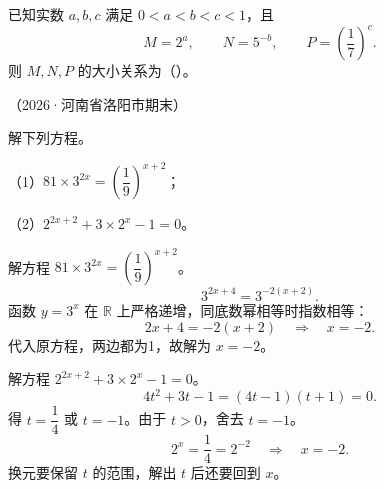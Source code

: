 \begin{frame}[t,label=AV04q]
  已知实数 $a,b,c$ 满足 $0<a<b<c<1$，且
  \[
    M=2^a,\qquad N=5^{-b},\qquad P=\left(\frac17\right)^c.
  \]
  则 $M,N,P$ 的大小关系为（\quad）。
  \par\vspace{0.2cm}（2026·河南省洛阳市期末）
  \pause
\end{frame}

\begin{frame}[t,label=A11q]
  解下列方程。
  \par\vspace{0.25cm}
  （1）$81\times3^{2x}=\left(\dfrac19\right)^{x+2}$；
  \par\vspace{0.25cm}
  （2）$2^{2x+2}+3\times2^x-1=0$。
  \pause
\end{frame}

\begin{frame}[t,label=A11a1]
  解方程 $81\times3^{2x}=\left(\dfrac19\right)^{x+2}$。
  \pause
  \[
    3^{2x+4}=3^{-2(x+2)}.
  \]
  函数 $y=3^x$ 在 $\mathbb R$ 上严格递增，同底数幂相等时指数相等：
  \[
    2x+4=-2(x+2)\quad\Longrightarrow\quad x=-2.
  \]
  代入原方程，两边都为1，故解为 $x=-2$。
\end{frame}

\begin{frame}[t,label=A11a2]
  解方程 $2^{2x+2}+3\times2^x-1=0$。
  \pause
  \[
    4t^2+3t-1=(4t-1)(t+1)=0.
  \]
  得 $t=\dfrac14$ 或 $t=-1$。由于 $t>0$，舍去 $t=-1$。
  \[
    2^x=\frac14=2^{-2}\quad\Longrightarrow\quad x=-2.
  \]
  换元要保留 $t$ 的范围，解出 $t$ 后还要回到 $x$。
\end{frame}

